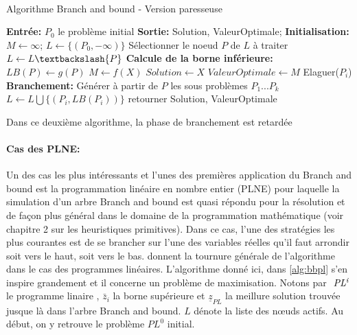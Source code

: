 \documentclass[12pt,a4paper,oneside]{book}
\theoremstyle{definition}
\begin{document}
	\paragraph{}
	\begin{algorithm}[H]
		\caption{Algorithme Branch and bound - Version paresseuse}
		\SetAlgoLined
		\DontPrintSemicolon
		\textbf{Entrée:} $P_0$ le problème initial \;
		\textbf{Sortie:} Solution, ValeurOptimale;
		\textbf{Initialisation:} $ M \gets \infty $; $L \gets \{(P_0,-\infty)\}$\;
		{
			Sélectionner le noeud $P$ de $L$ à traiter \;
			$L \gets L \textbackslash \{P\} $   \;
			\textbf{Calcule de la borne inférieure:} $LB(P) \gets g(P)$ \;
			{
				$M \gets f(X)$ \;
				$Solution \gets X$ \;
				$ValeurOptimale \gets M$ \;
			}
			{
				{
					Elaguer($P_i$) \;
				}
				{
					\textbf{Branchement:} Générer à partir de $P$ les sous problèmes $P_1 ... P_k$ \;
					{
						$L \gets L \bigcup \{(P_i,LB(P_i))\} $ \;
					}
				}
			}
			retourner Solution, ValeurOptimale \; 
		}
	\end{algorithm}
	Dans ce deuxième algorithme, la phase de branchement est retardée 
	
	\paragraph{Cas des PLNE:}
	Un des cas les plus intéressants et l'unes des premières application du Branch and bound est la programmation linéaire en nombre entier (PLNE) pour laquelle la simulation d'un arbre Branch and bound est quasi répondu pour la résolution et de façon plus général dans le domaine de la programmation mathématique (voir chapitre 2 sur les heuristiques primitives). Dans ce cas, l'une des stratégies les plus courantes est de se brancher sur l'une des variables réelles qu'il faut arrondir soit vers le haut, soit vers le bas.
	\cite{Lee2001} donnent la tournure générale de l'algorithme dans le cas des programmes linéaires.
	L'algorithme donné ici, dans \ref{alg:bbpl} s'en inspire grandement et il concerne un problème de maximisation.
	Notons par $\textit{ PL\textsuperscript{i}} $ le programme linaire , $\bar{z}_i$ la borne supérieure  et $\underline{z}_{PL}$ la meillure solution trouvée jusque là dans l'arbre Branch and bound. $L$ dénote la liste des nœuds actifs. Au début, on y retrouve le problème $PL^0$ initial.
	
\end{document}

